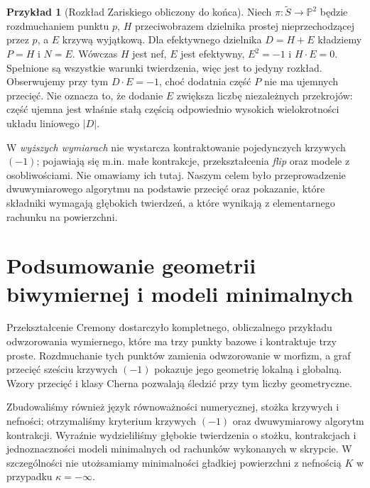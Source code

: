 \documentclass[11pt,a4paper,openany]{report}
\numberwithin{equation}{section}
\theoremstyle{plain}
\theoremstyle{definition}
\newtheorem{przyklad}[twierdzenie]{Przykład}
\theoremstyle{remark}
\newcommand{\PP}{\mathbb P}
\begin{document}
\begin{przyklad}[Rozkład Zariskiego obliczony do końca]
Niech $\pi:\widetilde S\to\PP^2$ będzie rozdmuchaniem
punktu $p$, $H$ przeciwobrazem dzielnika prostej
nieprzechodzącej przez $p$, a $E$ krzywą wyjątkową. Dla efektywnego dzielnika
$D=H+E$ kładziemy $P=H$ i $N=E$.
Wówczas $H$ jest nef, $E$ jest efektywny,
$E^2=-1$ i $H\cdot E=0$. Spełnione są wszystkie
warunki twierdzenia, więc jest to jedyny rozkład.
Obserwujemy przy tym $D\cdot E=-1$,
choć dodatnia część $P$ nie ma ujemnych przecięć.
Nie oznacza to, że dodanie $E$ zwiększa liczbę
niezależnych przekrojów: część ujemna jest
właśnie stałą częścią odpowiednio wysokich
wielokrotności układu liniowego $|D|$.
\end{przyklad}

W \emph{wyższych wymiarach} nie wystarcza
kontraktowanie pojedynczych krzywych $(-1)$;
pojawiają się m.in. małe kontrakcje, przekształcenia
\emph{flip} oraz modele z osobliwościami.
Nie omawiamy ich tutaj. Naszym celem było
przeprowadzenie dwuwymiarowego algorytmu na
podstawie przecięć oraz pokazanie, które składniki
wymagają głębokich twierdzeń, a które wynikają
z elementarnego rachunku na powierzchni.



\section{Podsumowanie geometrii biwymiernej i modeli minimalnych}
\label{sec:ga8-conclusion}

Przekształcenie Cremony dostarczyło kompletnego,
obliczalnego przykładu odwzorowania wymiernego,
które ma trzy punkty bazowe i kontraktuje trzy proste.
Rozdmuchanie tych punktów zamienia odwzorowanie
w morfizm, a graf przecięć sześciu krzywych
$(-1)$ pokazuje jego geometrię lokalną i globalną.
Wzory przecięć i klasy Cherna pozwalają śledzić
przy tym liczby geometryczne.

Zbudowaliśmy również język równoważności numerycznej,
stożka krzywych i nefności; otrzymaliśmy kryterium
krzywych $(-1)$ oraz dwuwymiarowy algorytm kontrakcji.
Wyraźnie wydzieliliśmy głębokie twierdzenia o stożku,
kontrakcjach i jednoznaczności modeli minimalnych od
rachunków wykonanych w skrypcie. W szczególności
nie utożsamiamy minimalności gładkiej powierzchni
z nefnością $K$ w przypadku $\kappa=-\infty$.
\end{document}

